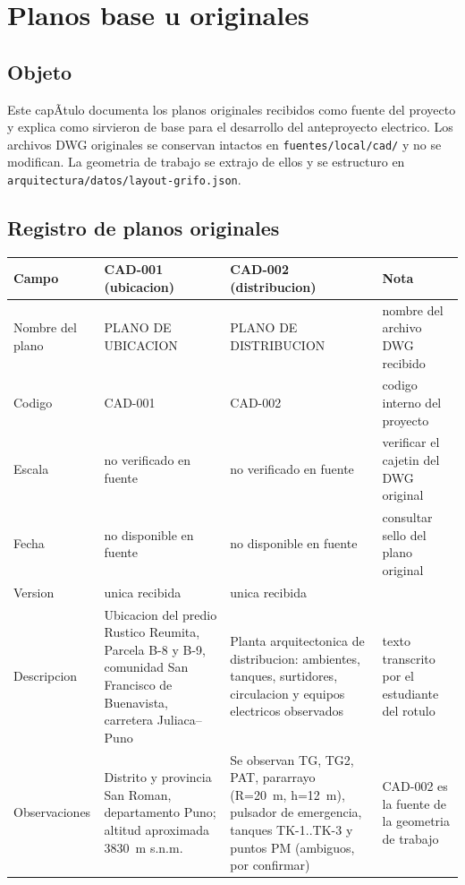 ﻿\chapter{Planos base u originales}
\label{chap:planos-base}

\section{Objeto}
Este capÃ­tulo documenta los planos originales recibidos como fuente del
proyecto y explica como sirvieron de base para el desarrollo del anteproyecto
electrico. Los archivos DWG originales se conservan intactos en
\texttt{fuentes/local/cad/} y no se modifican. La geometria de trabajo se
extrajo de ellos y se estructuro en
\texttt{arquitectura/datos/layout-grifo.json}.

\section{Registro de planos originales}

\begin{center}
\small
\begin{tabularx}{\linewidth}{@{}l p{3.4cm} p{3.4cm} X@{}}
\toprule
Campo & CAD-001 (ubicacion) & CAD-002 (distribucion) & Nota \\
\midrule
Nombre del plano & PLANO DE UBICACION & PLANO DE DISTRIBUCION &
  nombre del archivo DWG recibido \\
Codigo & CAD-001 & CAD-002 & codigo interno del proyecto \\
Escala & no verificado en fuente & no verificado en fuente &
  verificar el cajetin del DWG original \\
Fecha & no disponible en fuente & no disponible en fuente &
  consultar sello del plano original \\
Version & unica recibida & unica recibida & \\
Descripcion & Ubicacion del predio Rustico Reumita, Parcela B-8 y B-9, comunidad
  San Francisco de Buenavista, carretera Juliaca--Puno & Planta arquitectonica
  de distribucion: ambientes, tanques, surtidores, circulacion y equipos
  electricos observados &
  texto transcrito por el estudiante del rotulo \\
Observaciones & Distrito y provincia San Roman, departamento Puno; altitud
  aproximada 3830~m s.n.m. & Se observan TG, TG2, PAT, pararrayo (R=20~m,
  h=12~m), pulsador de emergencia, tanques TK-1..TK-3 y puntos PM (ambiguos,
  por confirmar) &
  CAD-002 es la fuente de la geometria de trabajo \\
\bottomrule
\end{tabularx}
\end{center}

